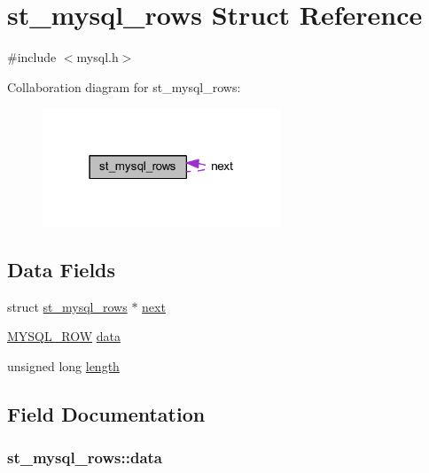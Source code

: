 \hypertarget{structst__mysql__rows}{}\section{st\+\_\+mysql\+\_\+rows Struct Reference}
\label{structst__mysql__rows}


{\ttfamily \#include $<$mysql.\+h$>$}



Collaboration diagram for st\+\_\+mysql\+\_\+rows\+:\nopagebreak
\begin{figure}[H]
\begin{center}
\leavevmode
\includegraphics[width=202pt]{structst__mysql__rows__coll__graph}
\end{center}
\end{figure}
\subsection*{Data Fields}
\begin{DoxyCompactItemize}
\item 
struct \hyperlink{structst__mysql__rows}{st\+\_\+mysql\+\_\+rows} $\ast$ \hyperlink{structst__mysql__rows_a83f438b68306724f8fd2f35758bbb2f7}{next}
\item 
\hyperlink{mysql_8h_afae8ad264fb6a4bd740df59f19b9da71}{M\+Y\+S\+Q\+L\+\_\+\+R\+O\+W} \hyperlink{structst__mysql__rows_a9e11c8188cb52a253df7ac713751b5e2}{data}
\item 
unsigned long \hyperlink{structst__mysql__rows_ae0da25ba59a9ef9c4e148664b3db13af}{length}
\end{DoxyCompactItemize}


\subsection{Field Documentation}
\hypertarget{structst__mysql__rows_a9e11c8188cb52a253df7ac713751b5e2}{}
\subsubsection[{data}]{ st\+\_\+mysql\+\_\+rows\+::data}\label{structst__mysql__rows_a9e11c8188cb52a253df7ac713751b5e2}
\hypertarget{structst__mysql__rows_ae0da25ba59a9ef9c4e148664b3db13af}{}

